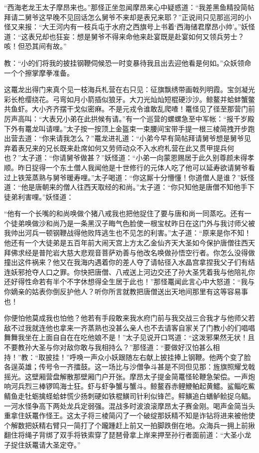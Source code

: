 \documentclass[12pt,UTF8]{ctexbook}
\begin{document}
“西海老龙王太子摩昂来也。”那怪正坐忽闻摩昂来心中疑惑道：“我差黑鱼精投简帖拜请二舅爷这早晚不见回话怎么舅爷不来却是表兄来耶？”正说间只见那巡河的小怪又来报：“大王河内有一枝兵屯于水府之西旗号上书着‘西海储君摩昂小帅’。”妖怪道：“这表兄却也狂妄：想是舅爷不得来命他来赴宴既是赴宴如何又领兵劳士？咳！但恐其间有故。”

教：“小的们将我的披挂钢鞭伺候恐一时变暴待我且出去迎他看是何如。”众妖领命一个个擦掌摩拳准备。

这鼍龙出得门来真个见一枝海兵札营在右只见：征旗飘绣带画戟列明霞。宝剑凝光彩长枪缨绕花。弓弯如月小箭插似狼牙。大刀光灿灿短棍硬沙沙。鲸鳌并蛤蚌蟹鳖共鱼虾。大小齐齐摆干戈似密麻。不是元戎令谁敢乱爬喳！鼍怪见了径至那营门前厉声高叫：“大表兄小弟在此拱候有请。”有一个巡营的螺螺急至中军帐：“报千岁殿下外有鼍龙叫请哩。”太子按一按顶上金盔束一束腰间宝带手提一根三棱简拽开步跑出营去道：“你来请我怎么？”鼍龙进礼道：“小弟今早有简帖拜请舅爷想是舅爷见弃着表兄来的兄长既来赴席如何又劳师动众不入水府札营在此又贯甲提兵何也？”太子道：“你请舅爷做甚？”妖怪道：“小弟一向蒙恩赐居于此久别尊颜未得孝顺。昨日捉得一个东土僧人我闻他是十世修行的元体人吃了他可以延寿欲请舅爷看过上铁笼蒸熟与舅爷暖寿哩。”太子喝道：“你这厮十分懵懂！你道僧人是谁？”妖怪道：“他是唐朝来的僧人往西天取经的和尚。”太子道：“你只知他是唐僧不知他手下徒弟利害哩。”妖怪道：

“他有一个长嘴的和尚唤做个猪八戒我也把他捉住了要与唐和尚一同蒸吃。还有一个徒弟唤做沙和尚乃是一条黑汉子晦气色脸使一根宝杖昨日在这门外与我讨师父被我帅出河兵一顿钢鞭战得他败阵逃生也不见怎的利害。”太子道：“原来是你不知！他还有一个大徒弟是五百年前大闹天宫上方太乙金仙齐天大圣如今保护唐僧往西天拜佛求经是普陀岩大慈大悲观音菩萨劝善与他改名唤做孙悟空行者。你怎么没得做撞出这件祸来？他又在我海内遇着你的差人夺了请帖径入水晶宫拿捏我父子们有结连妖邪抢夺人口之罪。你快把唐僧、八戒送上河边交还了孙大圣凭着我与他陪礼你还好得性命若有半个不字休想得全生居于此也！”那怪鼍闻此言心中大怒道：“我与你嫡亲的姑表你倒反护他人？听你所言就教把唐僧送出天地间那里有这等容易事也！

你便怕他莫成我也怕他？他若有手段敢来我水府门前与我交战三合我才与他师父若敌不过我就连他也拿来一齐蒸熟也没甚么亲人也不去请客自家关了门教小的们唱唱舞舞我坐在上面自自在在吃他娘不是！”太子见说开口骂道：“这泼邪果然无状！且不要教孙大圣与你对敌你敢与我相持么？”那怪道：“要做好汉怕甚么相持！”教：“取披挂！”呼唤一声众小妖跟随左右献上披挂捧上钢鞭。他两个变了脸各逞英雄；传号令一齐擂鼓。这一场比与沙僧争斗甚是不同但见那：旌旗照耀戈戟摇光。这壁厢营盘解散那壁厢门户开张。摩昂太子提金简鼍怪轮鞭急架偿。一声炮响河兵烈三棒锣鸣海士狂。虾与虾争蟹与蟹斗。鲸鳌吞赤鲤鯾鲌起黄鱨。鲨鲻吃鮆鲭鱼走牡蛎擒蛏蛤蚌慌少扬刺硬如铁棍鱑司针利似锋芒。鲆鱑追白蟮鲈鲙捉乌鲳。一河水怪争高下两处龙兵定弱强。混战多时波浪滚摩昂太子赛金刚。喝声金简当头重拿住妖鼍作怪王。这太子将三棱简闪了一个破绽那妖精不知是诈钻将进来被他使个解数把妖精右臂只一简打了个躘踵赶上前又一拍脚跌倒在地。众海兵一拥上前揪翻住将绳子背绑了双手将铁索穿了琵琶骨拿上岸来押至孙行者面前道：“大圣小龙子捉住妖鼍请大圣定夺。”
\end{document}
